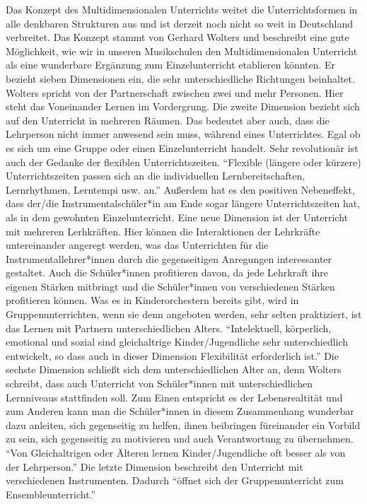 Das Konzept des Multidimensionalen Unterrichts weitet die Unterrichtsformen in
alle denkbaren Strukturen aus und ist derzeit noch nicht so weit in Deutschland
verbreitet. Das Konzept stammt von Gerhard Wolters und beschreibt eine gute
Möglichkeit, wie wir in unseren Musikschulen den Multidimensionalen Unterricht
als eine wunderbare Ergänzung zum Einzelunterricht etablieren könnten. Er
bezieht sieben Dimensionen ein, die sehr unterschiedliche Richtungen beinhaltet.
\autocite[86ff]{ernst:die_zukunftsfaehige_musikschule} Wolters spricht von der
Partnerschaft zwischen zwei und mehr Personen. Hier steht das Voneinander Lernen
im Vordergrung. Die zweite Dimension bezieht sich auf den Unterricht in mehreren
Räumen. Das bedeutet aber auch, dass die Lehrperson nicht immer anwesend sein
muss, während eines Unterrichtes. Egal ob es sich um eine Gruppe oder einen
Einzelunterricht handelt. Sehr revolutionär ist auch der Gedanke der flexiblen
Unterrichtszeiten. \enquote{Flexible (längere oder kürzere) Unterrichtszeiten
passen sich an die individuellen Lernbereitschaften, Lernrhythmen, Lerntempi
usw. an.} \autocite[87]{ernst:die_zukunftsfaehige_musikschule} Außerdem hat es
den positiven Nebeneffekt, dass der/die Instrumentalschüler*in am Ende sogar
längere Unterrichtszeiten hat, als in dem gewohnten Einzelunterricht. Eine neue
Dimension ist der Unterricht mit mehreren Lerhkräften. Hier können die
Interaktionen der Lehrkräfte untereinander angeregt werden, was das Unterrichten
für die Instrumentallehrer*innen durch die gegenseitigen Anregungen
interessanter gestaltet. Auch die Schüler*innen profitieren davon, da jede
Lehrkraft ihre eigenen Stärken mitbringt und die Schüler*innen von verschiedenen
Stärken profitieren können. Was es in Kinderorchestern bereits gibt, wird in
Gruppenunterrichten, wenn sie denn angeboten werden, sehr selten praktiziert,
ist das Lernen mit Partnern unterschiedlichen Alters. \enquote{Intelektuell,
körperlich, emotional und sozial sind gleichaltrige Kinder/Jugendliche sehr
unterschiedlich entwickelt, so dass auch in dieser Dimension Flexibilität
erforderlich ist.} \autocite[87]{ernst:die_zukunftsfaehige_musikschule} Die
sechste Dimension schließt sich dem unterschiedlichen Alter an, denn Wolters
schreibt, dass auch Unterricht von Schüler*innen mit unterschiedlichen
Lernniveaus stattfinden soll. Zum Einen entspricht es der Lebensrealtität und
zum Anderen kann man die Schüler*innen in diesem Zusammenhang wunderbar dazu
anleiten, sich gegenseitig zu helfen, ihnen beibringen füreinander ein Vorbild
zu sein, sich gegenseitig zu motivieren und auch Verantwortung zu übernehmen.
\enquote{Von Gleichaltrigen oder Älteren lernen Kinder/Jugendliche oft besser
als von der Lehrperson.} \autocite[87]{ernst:die_zukunftsfaehige_musikschule}
Die letzte Dimension beschreibt den Unterricht mit verschiedenen Instrumenten.
Dadurch
\enquote{öffnet sich der Gruppenunterricht zum Ensembleunterricht.}
\autocite[87]{ernst:die_zukunftsfaehige_musikschule}

